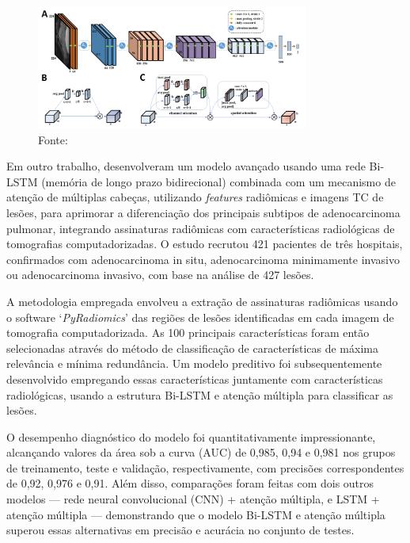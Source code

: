 \begin{figure}[htbp]
    \centering
    \includegraphics[width=0.8\textwidth]{figures/fig007.png}
    \caption{Fonte: \cite{jiangMRIBasedRadiomics2021}}
    \label{fig:fig007}
\end{figure}

Em outro trabalho, \cite{renBiLSTMMultiheadAttentionbased2023} desenvolveram um modelo avançado usando uma rede Bi-LSTM (memória de longo prazo bidirecional) combinada com um mecanismo de atenção de múltiplas cabeças, utilizando \textit{features} radiômicas e imagens TC de lesões, para aprimorar a diferenciação dos principais subtipos de adenocarcinoma pulmonar, integrando assinaturas radiômicas com características radiológicas de tomografias computadorizadas. O estudo recrutou 421 pacientes de três hospitais, confirmados com adenocarcinoma in situ, adenocarcinoma minimamente invasivo ou adenocarcinoma invasivo, com base na análise de 427 lesões.

A metodologia empregada envolveu a extração de assinaturas radiômicas usando o software `\textit{PyRadiomics}' das regiões de lesões identificadas em cada imagem de tomografia computadorizada. As 100 principais características foram então selecionadas através do método de classificação de características de máxima relevância e mínima redundância. Um modelo preditivo foi subsequentemente desenvolvido empregando essas características juntamente com características radiológicas, usando a estrutura Bi-LSTM e atenção múltipla para classificar as lesões.

O desempenho diagnóstico do modelo foi quantitativamente impressionante, alcançando valores da área sob a curva (AUC) de 0,985, 0,94 e 0,981 nos grupos de treinamento, teste e validação, respectivamente, com precisões correspondentes de 0,92, 0,976 e 0,91. Além disso, comparações foram feitas com dois outros modelos — rede neural convolucional (CNN) + atenção múltipla, e LSTM + atenção múltipla — demonstrando que o modelo Bi-LSTM e atenção múltipla superou essas alternativas em precisão e acurácia no conjunto de testes.

